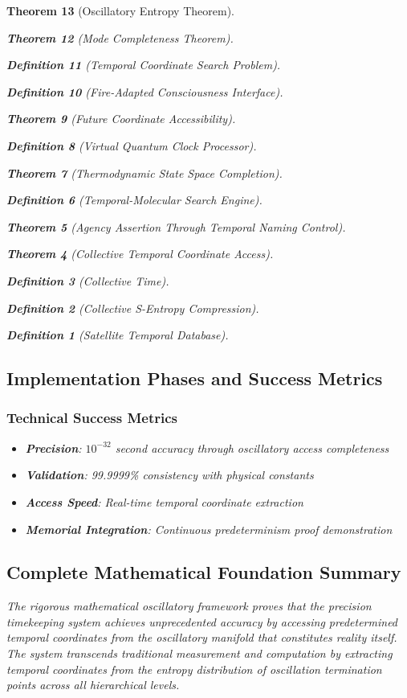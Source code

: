 \documentclass[12pt,a4paper]{article}
\newtheorem{theorem}{Theorem}[section]
\newtheorem{definition}[theorem]{Definition}
\begin{document}
\begin{theorem}[Oscillatory Entropy Theorem]
\begin{theorem}[Mode Completeness Theorem]
\begin{enumerate}
\begin{definition}[Temporal Coordinate Search Problem]
\begin{algorithm}
\begin{definition}[Fire-Adapted Consciousness Interface]
\begin{theorem}[Future Coordinate Accessibility]
\begin{definition}[Virtual Quantum Clock Processor]
\begin{itemize}
\begin{itemize}
\begin{theorem}[Thermodynamic State Space Completion]
\begin{definition}[Temporal-Molecular Search Engine]
\begin{theorem}[Agency Assertion Through Temporal Naming Control]
\begin{remark}
\begin{theorem}[Collective Temporal Coordinate Access]
\begin{definition}[Collective Time]
\begin{definition}[Collective S-Entropy Compression]
\begin{definition}[Satellite Temporal Database]
\begin{algorithm}
\begin{table}[h]
{{\subsection{Implementation Phases and Success Metrics}


\subsubsection{Technical Success Metrics}

\begin{itemize}
\item \textbf{Precision}: $10^{-32}$ second accuracy through oscillatory access completeness
\item \textbf{Validation}: 99.9999\% consistency with physical constants
\item \textbf{Access Speed}: Real-time temporal coordinate extraction
\item \textbf{Memorial Integration}: Continuous predeterminism proof demonstration
\end{itemize}

\subsection{Complete Mathematical Foundation Summary}

The rigorous mathematical oscillatory framework proves that the precision timekeeping system achieves unprecedented accuracy by accessing predetermined temporal coordinates from the oscillatory manifold that constitutes reality itself. The system transcends traditional measurement and computation by extracting temporal coordinates from the entropy distribution of oscillation termination points across all hierarchical levels.

}}
\end{table}
\end{algorithm}
\end{definition}
\end{definition}
\end{definition}
\end{theorem}
\end{remark}
\end{theorem}
\end{definition}
\end{theorem}
\end{itemize}
\end{itemize}
\end{definition}
\end{theorem}
\end{definition}
\end{algorithm}
\end{definition}
\end{enumerate}
\end{theorem}
\end{theorem}
\end{document}
